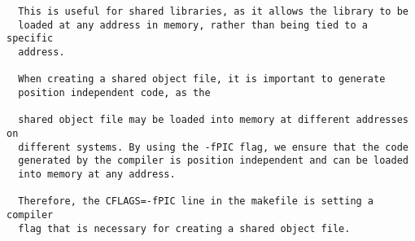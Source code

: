 \documentclass{article}
\begin{document}
\begin{Verbatim}
  This is useful for shared libraries, as it allows the library to be
  loaded at any address in memory, rather than being tied to a specific
  address.

  When creating a shared object file, it is important to generate
  position independent code, as the
  
  shared object file may be loaded into memory at different addresses on
  different systems. By using the -fPIC flag, we ensure that the code
  generated by the compiler is position independent and can be loaded
  into memory at any address.

  Therefore, the CFLAGS=-fPIC line in the makefile is setting a compiler
  flag that is necessary for creating a shared object file.
\end{Verbatim}
\end{document}
